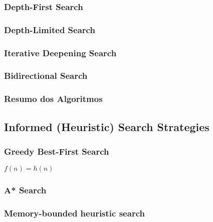 \documentclass[11pt]{article}
\begin{document}

\subsubsection{Depth-First Search}


\subsubsection{Depth-Limited Search}


\subsubsection{Iterative Deepening Search}


\subsubsection{Bidirectional Search}


\subsubsection*{Resumo dos Algoritmos}


\subsection{Informed (Heuristic) Search Strategies}


\subsubsection{Greedy Best-First Search}

$f(n) = h(n)$

\subsubsection{A* Search}


\subsubsection{Memory-bounded heuristic search}
\end{document}
